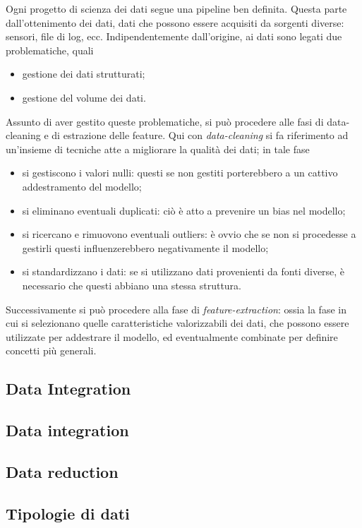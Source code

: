 \documentclass{subfiles}
\begin{document}
Ogni progetto di scienza dei dati segue una pipeline ben definita.
Questa parte dall'ottenimento dei dati, dati che possono essere acquisiti da sorgenti diverse: sensori, file di log, ecc.
Indipendentemente dall'origine, ai dati sono legati due problematiche, quali
\begin{itemize}
    \item gestione dei dati strutturati;
    \item gestione del volume dei dati.
\end{itemize}
Assunto di aver gestito queste problematiche, si può procedere alle fasi di data-cleaning e di estrazione delle feature.
Qui con \emph{data-cleaning} si fa riferimento ad un'insieme di tecniche atte a migliorare la qualità dei dati; in tale fase
\begin{itemize}
    \item si gestiscono i valori nulli: questi se non gestiti porterebbero a un cattivo addestramento del modello;
    \item si eliminano eventuali duplicati: ciò è atto a prevenire un bias nel modello;
    \item si ricercano e rimuovono eventuali outliers: è ovvio che se non si procedesse a gestirli questi influenzerebbero negativamente il modello;
    \item si standardizzano i dati: se si utilizzano dati provenienti da fonti diverse, è necessario che questi abbiano una stessa struttura.
\end{itemize}
Successivamente si può procedere alla fase di \emph{feature-extraction}: ossia la fase in cui si selezionano quelle caratteristiche valorizzabili dei dati,
che possono essere utilizzate per addestrare il modello, ed eventualmente combinate per definire concetti più generali.

\subsection{Data Integration}


\subsection{Data integration}


\subsection{Data reduction}


\subsection{Tipologie di dati}

\end{document}
